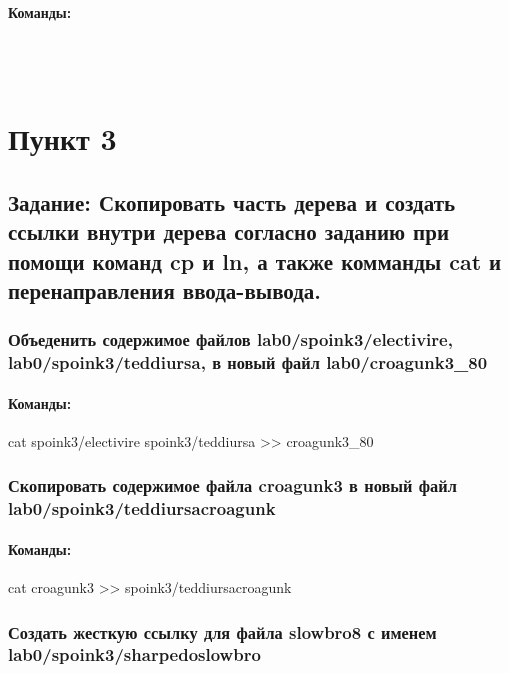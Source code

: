 \documentclass[12pt,onecolumn]{article}
\begin{document}
\begin{center}
\paragraph{Команды:}\\
\hfill\\

\end{center}
\section{Пункт 3}
\subsection{Задание: Скопировать часть дерева и создать ссылки внутри дерева согласно заданию при помощи команд cp и ln, а также комманды cat и перенаправления ввода-вывода.}

\subsubsection{Объеденить содержимое файлов lab0/spoink3/electivire, lab0/spoink3/teddiursa, в новый файл lab0/croagunk3\_80}

\paragraph{Команды:}

cat spoink3/electivire spoink3/teddiursa >> croagunk3\_80

\subsubsection{Скопировать содержимое файла croagunk3 в новый файл\\ lab0/spoink3/teddiursacroagunk}

\paragraph{Команды:}

cat croagunk3 >> spoink3/teddiursacroagunk 
\subsubsection {Создать жесткую ссылку для файла slowbro8 с именем\\
lab0/spoink3/sharpedoslowbro}
\end{document}
